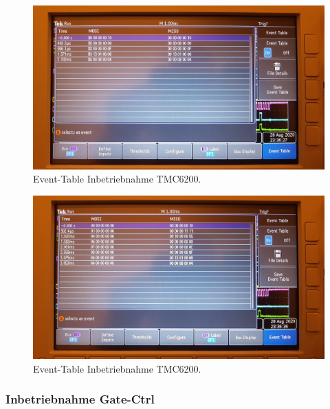 \begin{figure}[H]
\center
\includegraphics[width = \textwidth]{graphics/TMC6200_EventTable_Beschreiben_Bild}
\caption{Event-Table Inbetriebnahme TMC6200.}
\label{fig:TMC6200_EventTable_Beschreiben_Bild}
\end{figure}

\begin{figure}[H]
\center
\includegraphics[width = \textwidth]{graphics/TMC6200_EventTable_Lesen_Bild}
\caption{Event-Table Inbetriebnahme TMC6200.}
\label{fig:TMC6200_EventTable_Lesen_Bild}
\end{figure}

\subsubsection{Inbetriebnahme Gate-Ctrl}\label{Appendix:TMC6200_Gate_Ctrl}

